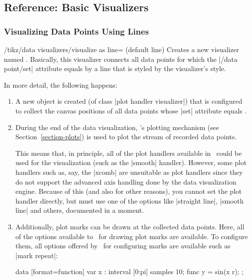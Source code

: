\subsection{Reference: Basic Visualizers}

\subsubsection{Visualizing Data Points Using Lines}

\begin{key}{/tikz/data visualizers/visualize as line= (default line)}
  Creates a new visualizer named . Basically, 
  this visualizer connects all data points for which the
  |/data point/set| attribute equals  by
  a line that is styled by the visualizer's style.

  In more detail, the following happens:
  \begin{enumerate}
  \item A new object is created (of class |plot handler visualizer|)
    that is configured to collect the canvas positions of all data
    points whose |set| attribute equals .
  \item During the end of the data visualization, \pgfname's plotting
    mechanism (see Section~\ref{section-plots}) is used to plot the
    stream of recorded data points.

    This means that, in principle, all of the plot handlers available
    in \tikzname\ could be used for the visualization (such as the
    |smooth| handler). However, some plot handlers such as, say, the
    |xcomb| are unsuitable as plot handlers since they do not support
    the advanced axis handling done by the data visualization
    engine. Because of this (and also for other reasons), you cannot
    set the plot handler directly, but must use one of the options
    like |straight line|, |smooth line| and others, documented in a
    moment.
  \item Additionally, plot marks can be drawn at the collected data
    points. Here, all of the options available to \tikzname\ for
    drawing plot marks are available. To configure them, all options
    offered by \tikzname\ for  configuring marks are available such as
    |mark repeat|:  
\begin{codeexample}[width=7cm]
\tikz \datavisualization
 [scientific clean axes, 
  visualize as line=my data,
  my data={style={mark=x, mark repeat=3}}]
data [format=function] {
  var x : interval [0:pi] samples 10;
  func y = sin(\value x r);
};
\end{codeexample}
  \end{enumerate}
  

\end{key}
